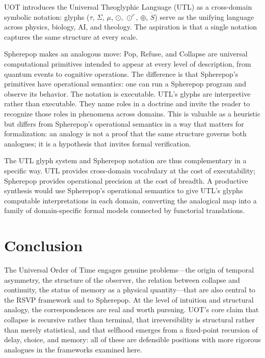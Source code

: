 \documentclass[12pt, oneside]{article}
\theoremstyle{plain-remark}
\newcommand{\utau}{\tau}
\newcommand{\uSigma}{\Sigma}
\newcommand{\umu}{\mu}
\newcommand{\ucollapse}{\odot}
\newcommand{\urcollapse}{\odot^r}
\newcommand{\uunion}{\oplus}
\newcommand{\uS}{\mathring{S}}
\begin{document}
UOT introduces the Universal Theoglyphic Language (UTL) as a cross-domain symbolic
notation: glyphs ($\utau$, $\uSigma$, $\umu$, $\ucollapse$, $\urcollapse$, $\uunion$,
$\uS$) serve as the unifying language across physics, biology, AI, and theology. The
aspiration is that a single notation captures the same structure at every scale.

Spherepop makes an analogous move: Pop, Refuse, and Collapse are universal computational
primitives intended to appear at every level of description, from quantum events to
cognitive operations. The difference is that Spherepop's primitives have operational
semantics: one can run a Spherepop program and observe its behavior. The notation is
executable. UTL's glyphs are interpretive rather than executable. They name roles in a
doctrine and invite the reader to recognize those roles in phenomena across domains.
This is valuable as a heuristic but differs from Spherepop's operational semantics in
a way that matters for formalization: an analogy is not a proof that the same structure
governs both analogues; it is a hypothesis that invites formal verification.

The UTL glyph system and Spherepop notation are thus complementary in a specific way.
UTL provides cross-domain vocabulary at the cost of executability; Spherepop provides
operational precision at the cost of breadth. A productive synthesis would use
Spherepop's operational semantics to give UTL's glyphs computable interpretations
in each domain, converting the analogical map into a family of domain-specific formal
models connected by functorial translations.


\section{Conclusion}

The Universal Order of Time engages genuine problems---the origin of temporal asymmetry,
the structure of the observer, the relation between collapse and continuity, the status
of memory as a physical quantity---that are also central to the RSVP framework and to
Spherepop. At the level of intuition and structural analogy, the correspondences are
real and worth pursuing. UOT's core claim that collapse is recursive rather than terminal,
that irreversibility is structural rather than merely statistical, and that selfhood
emerges from a fixed-point recursion of delay, choice, and memory: all of these are
defensible positions with more rigorous analogues in the frameworks examined here.
\end{document}
